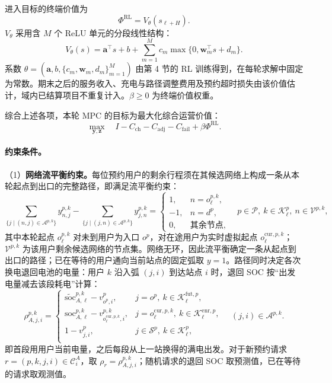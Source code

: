 \documentclass[12pt,a4paper,UTF8]{ctexart}
\begin{document}
进入目标的终端价值为
\begin{equation}
\Phi^{\mathrm{RL}}
=V_\theta\!\left(s_{\ell+H}\right).
\label{eq:rl_terminal_value}
\end{equation}
$V_\theta$ 采用含 $M$ 个 ReLU 单元的分段线性结构：
\begin{equation}
V_\theta(s)
=\boldsymbol a^\top s+b
+\sum_{m=1}^{M}c_m
\max\{0,\boldsymbol w_m^\top s+d_m\}.
\label{eq:pwl_critic}
\end{equation}
系数 $\theta=(\boldsymbol a,b,\{c_m,\boldsymbol w_m,d_m\}_{m=1}^{M})$ 由第 4 节的 RL 训练得到，在每轮求解中固定为常数。期末之后的服务收入、充电与路径调整费用及预约超时损失由该价值估计，域内已结算项目不重复计入。$\beta\ge0$ 为终端价值权重。

综合上述各项，本轮 MPC 的目标为最大化综合运营价值：
\begin{equation}
\max_{\mathbf y,\mathbf z}\quad
I-C_{\mathrm{ch}}-C_{\mathrm{adj}}-C_{\mathrm{fail}}
+\beta\Phi^{\mathrm{RL}}.
\label{eq:objective}
\end{equation}


\paragraph{约束条件。}

 
（1）\textbf{网络流平衡约束。}每位预约用户的剩余行程须在其候选网络上构成一条从本轮起点到出口的完整路径，即满足流平衡约束：
\begin{equation}
\sum_{\{j\mid(n,j)\in\mathcal A^{p,k}\}}
y_{n,j}^{p,k}
-
\sum_{\{j\mid(j,n)\in\mathcal A^{p,k}\}}
y_{j,n}^{p,k}
=
\begin{cases}
1,&n=o_\ell^{p,k},\\
-1,&n=d^p,\\
0,&\text{其余节点},
\end{cases}
\quad
p\in\mathcal P,\ k\in\mathcal K_\ell^p,\ n\in\mathcal V^{p,k},
\label{eq:flow}
\end{equation}
其中本轮起点 $o_\ell^{p,k}$ 对未到用户为入口 $o^p$，对在途用户为实时虚拟起点 $o_\ell^{\mathrm{cur},p,k}$；$\mathcal V^{p,k}$ 为该用户剩余候选网络的节点集。网络无环，因此流平衡确定一条从起点到出口的路径；已在等待的用户通向当前站点的固定弧取 $y=1$。路径同时决定各次换电退回电池的电量：用户 $k$ 沿入弧 $(j,i)$ 到达站点 $i$ 时，退回 SOC 按“出发电量减去该段耗电”计算：
\begin{equation}
\rho_{A,j,i}^{p,k}
=
\begin{cases}
\widetilde{\mathrm{soc}}_{A,\ell}^{p,k}-v_{o^p,i}^{p},
&j=o^p,\ k\in\mathcal K_\ell^{\mathrm{fut},p},\\[2pt]
\mathrm{soc}_{A,\ell}^{p,k}
-v_{o_\ell^{\mathrm{cur},p,k},i}^{p,k},
&j=o_\ell^{\mathrm{cur},p,k},\ k\in\mathcal K_\ell^{\mathrm{enr},p},\\[2pt]
1-v_{j,i}^{p},
&j\in\mathcal S^p,\ k\in\mathcal K_\ell^{p},\\[2pt]
\end{cases}
\quad (j,i)\in\mathcal A^{p,k}.
\label{eq:return_soc}
\end{equation}
即首段用用户当前电量，之后每段从上一站换得的满电出发。对于新预约请求 $r=(p,k,j,i)\in\mathcal C_i^A$，取 $\rho_r=\rho_{A,j,i}^{p,k}$；随机请求的退回 SOC 取预测值，已在等待的请求取观测值。
\end{document}
